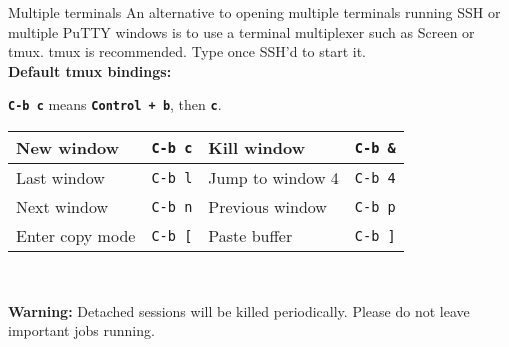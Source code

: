 \begin{block}{Multiple terminals}
  An alternative to opening multiple terminals running SSH or multiple PuTTY windows is to use a terminal multiplexer such as Screen or tmux. tmux is recommended. Type  once SSH'd to start it. \\[0.7em]
  \textbf{Default tmux bindings:} \\
  {\newcommand{\key}[1]{\texttt{C-b #1}}
    \textbf{\key{c}} means \textbf{\texttt{Control + b}}, then \textbf{\texttt{c}}.
    \begin{tabu} to 0.9\linewidth { X[2] X X[2] X }
      \hline
      New window & \key{c} & Kill window & \key{\&} \\ \hline
      Last window & \key{l} & Jump to window 4 & \key{4} \\ \hline
      Next window & \key{n} & Previous window & \key{p} \\ \hline
      Enter copy mode & \key{[} & Paste buffer & \key{]} \\ \hline
    \end{tabu} \\[1em]
  }
  \textbf{Warning:} Detached sessions will be killed periodically. Please do not leave important jobs running.

\end{block}
